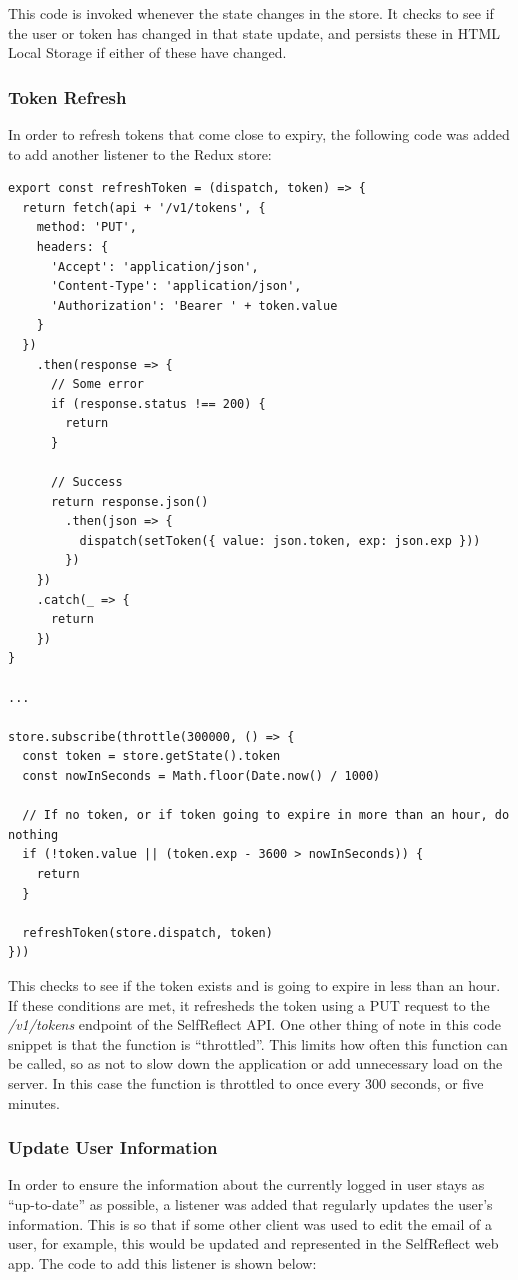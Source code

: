 \documentclass[11pt,openright,a4paper]{report}
\begin{document}
This code is invoked whenever the state changes in the store. It checks to see if the user or token has changed in that state update, and persists these in HTML Local Storage if either of these have changed.

\subsubsection{Token Refresh}
In order to refresh tokens that come close to expiry, the following code was added to add another listener to the Redux store:
\begin{lstlisting}
export const refreshToken = (dispatch, token) => {
  return fetch(api + '/v1/tokens', {
    method: 'PUT',
    headers: {
      'Accept': 'application/json',
      'Content-Type': 'application/json',
      'Authorization': 'Bearer ' + token.value
    }
  })
    .then(response => {
      // Some error
      if (response.status !== 200) {
        return
      }

      // Success
      return response.json()
        .then(json => {
          dispatch(setToken({ value: json.token, exp: json.exp }))
        })
    })
    .catch(_ => {
      return
    })
}

...

store.subscribe(throttle(300000, () => {
  const token = store.getState().token
  const nowInSeconds = Math.floor(Date.now() / 1000)

  // If no token, or if token going to expire in more than an hour, do nothing
  if (!token.value || (token.exp - 3600 > nowInSeconds)) {
    return
  }

  refreshToken(store.dispatch, token)
}))
\end{lstlisting}

This checks to see if the token exists and is going to expire in less than an hour. If these conditions are met, it refresheds the token using a PUT request to the \emph{/v1/tokens} endpoint of the SelfReflect API. One other thing of note in this code snippet is that the function is \enquote{throttled}. This limits how often this function can be called, so as not to slow down the application or add unnecessary load on the server. In this case the function is throttled to once every 300 seconds, or five minutes.

\subsubsection{Update User Information}
In order to ensure the information about the currently logged in user stays as \enquote{up-to-date} as possible, a listener was added that regularly updates the user's information. This is so that if some other client was used to edit the email of a user, for example, this would be updated and represented in the SelfReflect web app. The code to add this listener is shown below:
\end{document}
